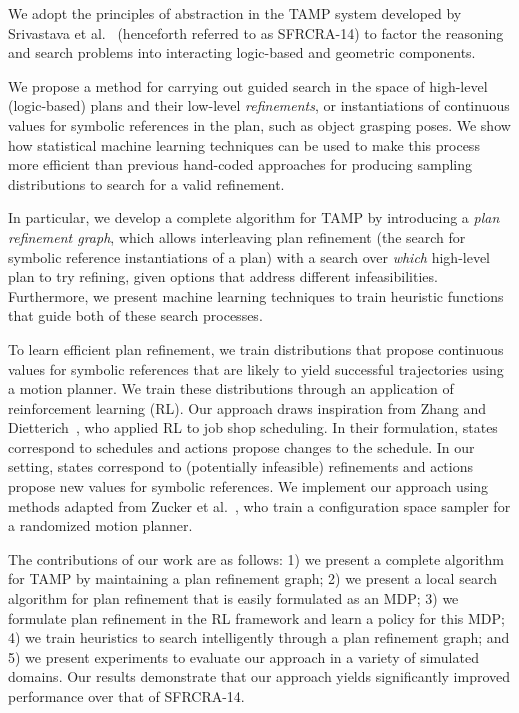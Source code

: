 We adopt the principles of abstraction in the TAMP system developed by
Srivastava et al.~\cite{srivastava2014combined} (henceforth referred
to as SFRCRA-14) to factor the reasoning and search problems into
interacting logic-based and geometric components.

We propose a method for carrying out guided search in the space of
high-level (logic-based) plans and their low-level
\emph{refinements}, or instantiations of continuous values for
symbolic references in the plan, such as object grasping poses.
We show how statistical machine learning techniques can be used
to make this process more efficient than previous hand-coded
approaches for producing sampling distributions to search for a valid refinement.

In particular, we develop a complete algorithm for TAMP by introducing
a \emph{plan refinement graph}, which allows interleaving plan
refinement (the search for symbolic reference instantiations of a plan) with a
search over \emph{which} high-level plan to try refining, given options
that address different infeasibilities. Furthermore, we present
machine learning techniques to train heuristic functions that guide
both of these search processes.

To learn efficient plan refinement, we train distributions
that propose continuous values for symbolic references that are likely to yield
successful trajectories using a motion planner. We train these distributions through an
application of reinforcement learning (RL). Our approach draws inspiration
from Zhang and Dietterich~\cite{JobShopSched}, who applied RL to job
shop scheduling. In their formulation, states correspond to schedules
and actions propose changes to the schedule. In our setting, states
correspond to (potentially infeasible) refinements and actions propose
new values for symbolic references. We implement our approach using methods
adapted from Zucker et al.~\cite{workspacebias}, who train a
configuration space sampler for a randomized motion planner.

The contributions of our work are as follows: 1) we present a complete
algorithm for TAMP by maintaining a plan refinement graph; 2) we
present a local search algorithm for plan refinement that is easily
formulated as an MDP; 3) we formulate plan refinement in the RL
framework and learn a policy for this MDP; 4) we train heuristics to
search intelligently through a plan refinement graph; and 5) we
present experiments to evaluate our approach in a variety of simulated
domains. Our results demonstrate that our approach yields
significantly improved performance over that of SFRCRA-14.
